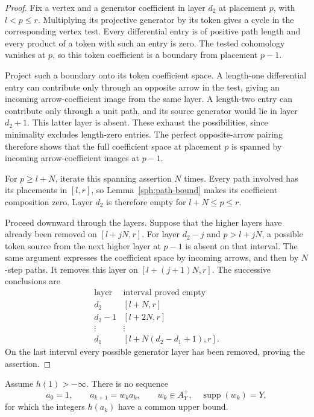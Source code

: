 \begin{proof}
Fix a vertex and a generator coefficient in layer \(d_2\)
at placement \(p\), with \(l<p\leq r\).
Multiplying its projective generator by its token gives
a cycle in the corresponding vertex test.  Every
differential entry is of positive path length and every
product of a token with such an entry is zero.
The tested cohomology vanishes at \(p\), so this token
coefficient is a boundary from placement \(p-1\).

Project such a boundary onto its token coefficient
space.  A length-one differential entry can contribute
only through an opposite arrow in the test, giving an
incoming arrow-coefficient image from the same layer.
A length-two entry can contribute only through a unit
path, and its source generator would lie in layer
\(d_2+1\).  This latter layer is absent.
These exhaust the possibilities, since minimality
excludes length-zero entries.  The perfect
opposite-arrow pairing therefore shows that the full
coefficient space at placement \(p\) is spanned by
incoming arrow-coefficient images at \(p-1\).

For \(p\geq l+N\), iterate this spanning assertion \(N\)
times.  Every path involved has its placements in
\([l,r]\), so Lemma~\ref{sph:path-bound} makes its
coefficient composition zero.  Layer \(d_2\) is
therefore empty for \(l+N\leq p\leq r\).

Proceed downward through the layers.  Suppose that
the higher layers have already been removed on
\([l+jN,r]\).  For layer \(d_2-j\) and
\(p>l+jN\), a possible token source from the next
higher layer at \(p-1\) is absent on that interval.
The same argument expresses the coefficient space
by incoming arrows, and then by \(N\)-step paths.
It removes this layer on \([l+(j+1)N,r]\).
The successive conclusions are
\[
 \begin{array}{c|c}
 \text{layer}&\text{interval proved empty}\\ \hline
 d_2 &[l+N,r]\\
 d_2-1 &[l+2N,r]\\
 \vdots&\vdots\\
 d_1 &[l+N(d_2-d_1+1),r].
 \end{array}
\]
On the last interval every possible generator layer
has been removed, proving the assertion.
\end{proof}

\begin{proposition}\label{sph:no-chain}
Assume \(h(1)>-\infty\).
There is no sequence
\[
 a_0=1,\qquad a_{k+1}=w_k a_k,\qquad
 w_k\in A_Y^+,\quad\operatorname{supp}(w_k)=Y,
\]
for which the integers \(h(a_k)\) have a common upper
bound.
\end{proposition}


